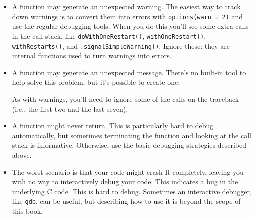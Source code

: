 \begin{itemize}
\item
  A function may generate an unexpected warning. The easiest way to
  track down warnings is to convert them into errors with
  \texttt{options(warn = 2)} and use the regular debugging tools. When
  you do this you'll see some extra calls in the call stack, like
  \texttt{doWithOneRestart()}, \texttt{withOneRestart()},
  \texttt{withRestarts()}, and \texttt{.signalSimpleWarning()}. Ignore
  these: they are internal functions used to turn warnings into errors.
\item
  A function may generate an unexpected message. There's no built-in
  tool to help solve this problem, but it's possible to create one:

\begin{Shaded}
\begin{Highlighting}[]
\StringTok{ }
   
\NormalTok{\}}

\StringTok{ }\NormalTok{()}
\StringTok{ }\NormalTok{(}\NormalTok{)}
\NormalTok{()}
\NormalTok{(}\NormalTok{())}
\NormalTok{()}
\end{Highlighting}
\end{Shaded}

  As with warnings, you'll need to ignore some of the calls on the
  traceback (i.e., the first two and the last seven).
\item
  A function might never return. This is particularly hard to debug
  automatically, but sometimes terminating the function and looking at
  the call stack is informative. Otherwise, use the basic debugging
  strategies described above.
\item
  The worst scenario is that your code might crash R completely, leaving
  you with no way to interactively debug your code. This indicates a bug
  in the underlying C code. This is hard to debug. Sometimes an
  interactive debugger, like \texttt{gdb}, can be useful, but describing
  how to use it is beyond the scope of this book.


\end{itemize}
